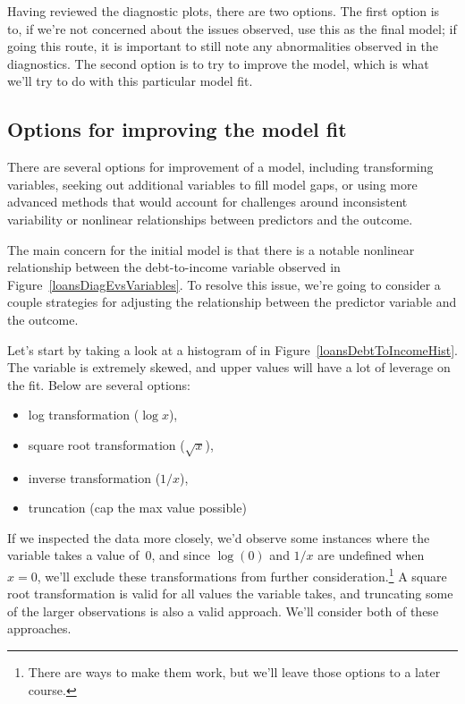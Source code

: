Having reviewed the diagnostic plots, there are two options.
The first option is to, if we're not concerned about the issues
observed, use this as the final model;
if going this route, it is important to still note any
abnormalities observed in the diagnostics.
The second option is to try to improve the model,
which is what we'll try to do with this particular model fit.



\D{\newpage}

\subsection{Options for improving the model fit}

There are several options for improvement of a model,
including transforming variables,
seeking out additional variables to fill model gaps,
or using more advanced methods that would account for
challenges around inconsistent variability or nonlinear
relationships between predictors and the outcome.

The main concern for the initial model is that
there is a notable nonlinear relationship
between the debt-to-income variable observed in
Figure~\ref{loansDiagEvsVariables}.
To resolve this issue, we're going to consider
a couple strategies for adjusting the relationship
between the predictor variable and the outcome.

Let's start by taking a look at a histogram of
 in
Figure~\ref{loansDebtToIncomeHist}.
The variable is extremely skewed,
and upper values will have a lot of leverage
on the fit.
Below are several options:
\begin{itemize}
\item log transformation ($\log{x}$),
\item square root transformation ($\sqrt{x}$),
\item inverse transformation ($1 / x$),
\item truncation (cap the max value possible)
\end{itemize}
If we inspected the data more closely, we'd observe
some instances where the variable takes a value of~0,
and since $\log(0)$ and $1 / x$ are undefined when $x = 0$,
we'll exclude these transformations from further
consideration.\footnote{There are ways to make them work,
   but we'll leave those options to a later course.}
A square root transformation is valid for all values
the variable takes, and truncating some of the larger
observations is also a valid approach.
We'll consider both of these approaches.

